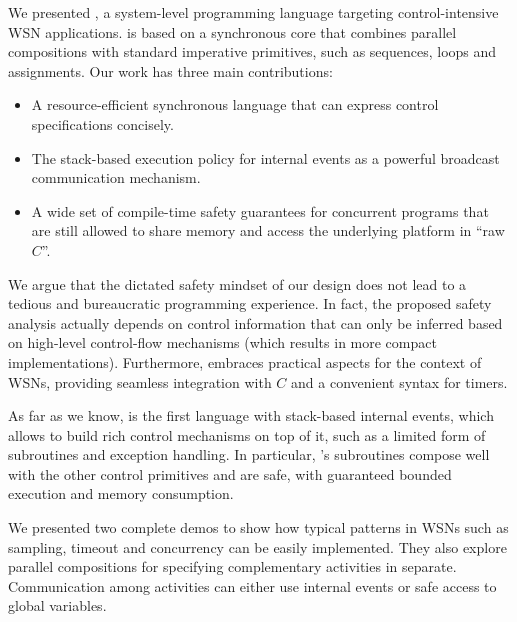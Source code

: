 
We presented \CEU, a system-level programming language targeting 
control-intensive WSN applications.
\CEU is based on a synchronous core that combines parallel compositions with 
standard imperative primitives, such as sequences, loops and assignments.
%
Our work has three main contributions:
%
\begin{itemize}
%
\item A resource-efficient synchronous language that can express control 
      specifications concisely.
%
\item The stack-based execution policy for internal events as a powerful 
      broadcast communication mechanism.
%
\item A wide set of compile-time safety guarantees for concurrent programs that 
      are still allowed to share memory and access the underlying platform in 
``raw $C$''.
%
\end{itemize}

%

We argue that the dictated safety mindset of our design does not lead to a 
tedious and bureaucratic programming experience.
%
In fact, the proposed safety analysis actually depends on control information 
that can only be inferred based on high-level control-flow mechanisms (which 
results in more compact implementations).
%
Furthermore, \CEU embraces practical aspects for the context of WSNs, providing 
seamless integration with $C$ and a convenient syntax for timers.
%

As far as we know, \CEU is the first language with stack-based internal events, 
which allows to build rich control mechanisms on top of it, such as a limited 
form of subroutines and exception handling.
%
In particular, \CEU's subroutines compose well with the other control 
primitives and are safe, with guaranteed bounded execution and memory 
consumption.

We presented two complete demos to show how typical patterns in WSNs such as 
sampling, timeout and concurrency can be easily implemented.
They also explore parallel compositions for specifying complementary activities 
in separate.
Communication among activities can either use internal events or safe access to 
global variables.

